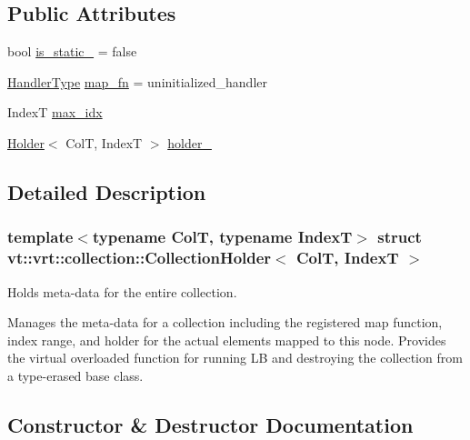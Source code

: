 \subsection*{Public Attributes}
\begin{DoxyCompactItemize}
\item 
bool \hyperlink{structvt_1_1vrt_1_1collection_1_1_collection_holder_ab8d1f8570cd85775b2c8317255827dae}{is\+\_\+static\+\_\+} = false
\item 
\hyperlink{namespacevt_af64846b57dfcaf104da3ef6967917573}{Handler\+Type} \hyperlink{structvt_1_1vrt_1_1collection_1_1_collection_holder_a1bacbcdc0af1d6a69abf890304c78233}{map\+\_\+fn} = uninitialized\+\_\+handler
\item 
IndexT \hyperlink{structvt_1_1vrt_1_1collection_1_1_collection_holder_a1d6e15b6f578ae048c11c2c367651f00}{max\+\_\+idx}
\item 
\hyperlink{structvt_1_1vrt_1_1collection_1_1_holder}{Holder}$<$ ColT, IndexT $>$ \hyperlink{structvt_1_1vrt_1_1collection_1_1_collection_holder_a509a3abe1ab350cc1d108030977ab0e9}{holder\+\_\+}
\end{DoxyCompactItemize}


\subsection{Detailed Description}
\subsubsection*{template$<$typename ColT, typename IndexT$>$\newline
struct vt\+::vrt\+::collection\+::\+Collection\+Holder$<$ Col\+T, Index\+T $>$}

Holds meta-\/data for the entire collection. 

Manages the meta-\/data for a collection including the registered map function, index range, and holder for the actual elements mapped to this node. Provides the virtual overloaded function for running LB and destroying the collection from a type-\/erased base class. 

\subsection{Constructor \& Destructor Documentation}
\mbox{\label{structvt_1_1vrt_1_1collection_1_1_collection_holder_a75bb95393ac580b3f330da43e295a47a}} 
